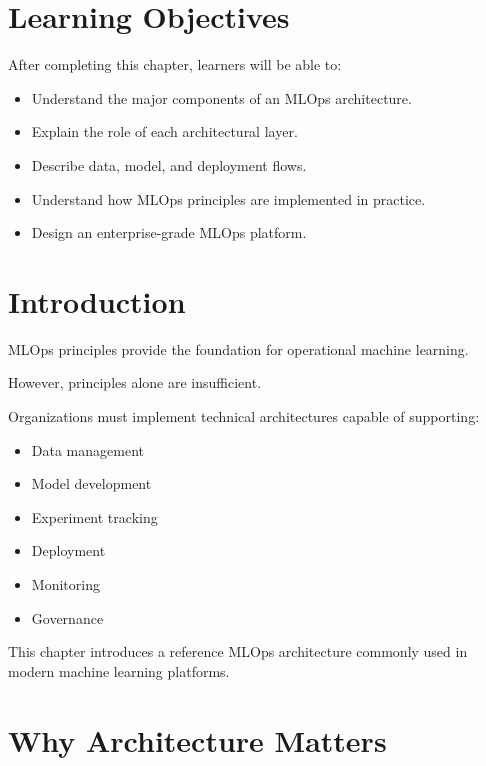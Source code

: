 
\label{chap:mlops-architecture}

\section{Learning Objectives}

After completing this chapter, learners will be able to:

\begin{itemize}
    \item Understand the major components of an MLOps architecture.
    \item Explain the role of each architectural layer.
    \item Describe data, model, and deployment flows.
    \item Understand how MLOps principles are implemented in practice.
    \item Design an enterprise-grade MLOps platform.
\end{itemize}

\section{Introduction}

MLOps principles provide the foundation for operational machine learning.

However, principles alone are insufficient.

Organizations must implement technical architectures capable of supporting:

\begin{itemize}
    \item Data management
    \item Model development
    \item Experiment tracking
    \item Deployment
    \item Monitoring
    \item Governance
\end{itemize}

This chapter introduces a reference MLOps architecture commonly used in modern machine learning platforms.

\section{Why Architecture Matters}

